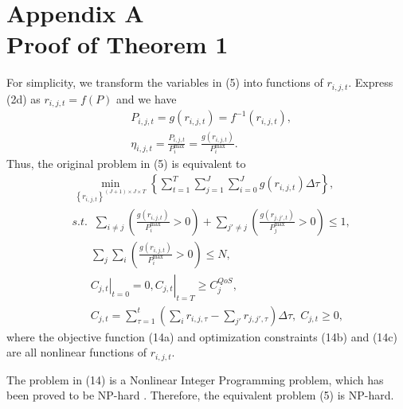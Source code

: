 \documentclass[conference]{IEEEtran}
\begin{document}
\section*{Appendix A \\ Proof of Theorem 1}
For simplicity, we transform the variables in (5) into functions of $r_{i,j,t}$.
Express (2d) as ${r_{i,j,t}} = f\left( P \right)$ and we have 
\begin{subequations}
  \begin{align}
  & {P_{i,j,t}} = g\left( {{r_{i,j,t}}} \right) = {f^{ - 1}}\left( {{r_{i,j,t}}} \right), \\
  & {\eta _{i,j,t}} = \frac{{{P_{i,j,t}}}}{{P_i^{\max }}} = \frac{{g\left( {{r_{i,j,t}}} \right)}}{{P_i^{\max }}}.
  \end{align}
\end{subequations}
Thus, the original problem in (5) is equivalent to 
\begin{subequations}
  \begin{align}
  & \mathop {\min }\limits_{{{\left\{ {{r_{i,j,t}}} \right\}}^{\left( {J + 1} \right) \times J \times T}}} \left\{ {\sum\limits_{t = 1}^T {\sum\limits_{j = 1}^J {\sum\limits_{i = 0}^J {g\left( {{r_{i,j,t}}} \right) \Delta \tau } } } } \right\}, \\
  & {s.t.} \;\; \sum\limits_{i \ne j} {\left( {\frac{{g\left( {{r_{i,j,t}}} \right)}}{{P_i^{\max }}} > 0} \right)}  + \sum\limits_{j' \ne j} {\left( {\frac{{g\left( {{r_{j,j',t}}} \right)}}{{P_j^{\max }}} > 0} \right) \le {1}}, \\
  & \;\;\;\;\;\; \sum\limits_j {\sum\limits_i {\left( {\frac{{g\left( {{r_{i,j,t}}} \right)}}{{P_i^{\max }}} > 0} \right)} }  \le N, \\
  & \;\;\;\;\;\; {\left. {{{\left. {{C_{j,t}}} \right|}_{t = 0}} = 0, {C_{j,t}}} \right|_{t = T}} \ge C_j^{QoS} ,\\
  & \;\;\;\;\;\; {C_{j,t}} = \sum\limits_{\tau  = 1}^t {\left( {\sum\limits_i {{r_{i,j,\tau }}}  - \sum\limits_{j'} {{r_{j,j',\tau }}} } \right)\Delta \tau } ,\; {C_{j,t}} \ge 0,
  \end{align}
\end{subequations}
where the objective function (14a) and optimization constraints (14b) and (14c) are all nonlinear functions of $r_{i,j,t}$.

The problem in (14) is a Nonlinear Integer Programming problem, which has been proved to be NP-hard \cite{p406}. 
Therefore, the equivalent problem (5) is NP-hard.
\end{document}
